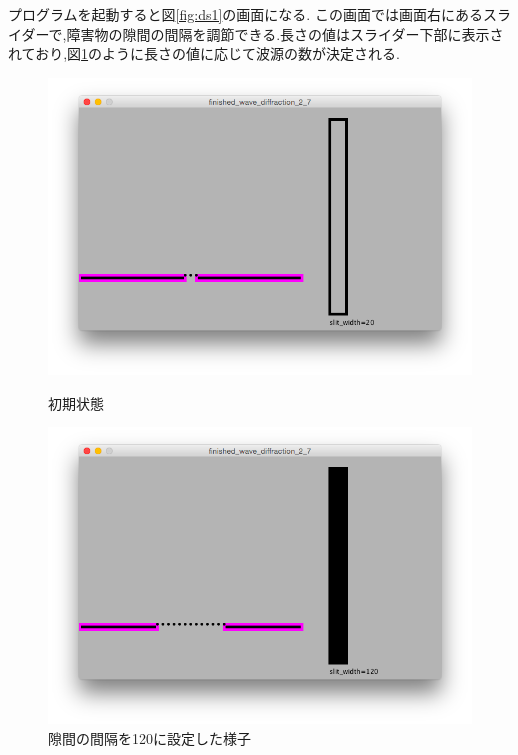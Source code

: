 プログラムを起動すると図\ref{fig:ds1}の画面になる.
この画面では画面右にあるスライダーで,障害物の隙間の間隔を調節できる.長さの値はスライダー下部に表示されており,図\ref{fig:ds2}のように長さの値に応じて波源の数が決定される.
\begin{figure}[H]
\begin{minipage}{0.5\hsize}
\begin{center}
\includegraphics[width=\linewidth]
  {../result/diffractionstart1.png}
\caption{初期状態}
\label{fig:ds1}
\end{center}
\end{minipage}%
\begin{minipage}{0.5\hsize}
\begin{center}
\includegraphics[width=\linewidth]
  {../result/diffractionstart2.png}
\caption{隙間の間隔を120に設定した様子}
\label{fig:ds2}
\end{center}
\end{minipage}
\end{figure}



